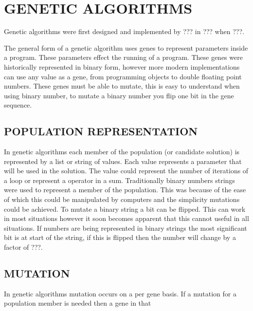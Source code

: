 \documentclass[10pt,twocolumn]{article}
\begin{document}
\paragraph{}

\paragraph{}



\section{GENETIC ALGORITHMS}

Genetic algorithms were first designed and implemented by ??? in ??? when ???.

The general form of a genetic algorithm uses genes to represent parameters inside a program.
These parameters effect the running of a program.
These genes were historically represented in binary form, however more modern implementations can use any value as a gene, from programming objects to double floating point numbers.
These genes must be able to mutate, this is easy to understand when using binary number, to mutate a binary number you flip one bit in the gene sequence. 

\subsection{POPULATION REPRESENTATION}
In genetic algorithms each member of the population (or candidate solution) is represented by a list or string of values.
Each value represents a parameter that will be used in the solution.
The value could represent the number of iterations of a loop or represent a operator in a sum.
Traditionally binary numbers strings were used to represent a member of the population.
This was because of the ease of which this could be manipulated by computers and the simplicity mutations could be achieved.
To mutate a binary string a bit can be flipped.
This can work in most situations however it soon becomes apparent that this cannot useful in all situations.
If numbers are being represented in binary strings the most significant bit is at start of the string, if this is flipped then the number will change by a factor of ???.


\subsection{MUTATION}
In genetic algorithms mutation occurs on a per gene basis. If a mutation for a population member is needed then a gene in that 
\end{document}
